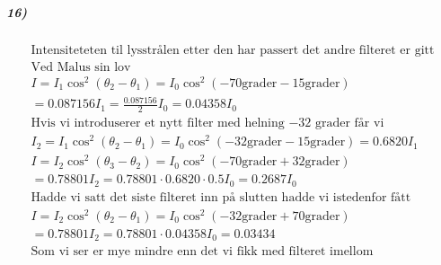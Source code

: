 \documentclass[11pt, A4paper,norsk]{article}
\begin{document}
			\subparagraph{16)}
				\begin{gather*}
\text{Intensiteteten til lysstrålen etter den har passert det andre filteret er gitt} \\
\text{Ved Malus sin lov} \\
I = I_1 \cos^2(\theta_2 - \theta_1) = I_0 \cos^2(-70 \text{grader} - 15 \text{grader}) \\
= 0.087156 I_1 = \frac{0.087156}{2} I_0 = 0.04358 I_0 \\
\text{Hvis vi introduserer et nytt filter med helning $-32$ grader får vi} \\
I_2 = I_1 \cos^2(\theta_2 - \theta_1) = I_0 \cos^2(-32 \text{grader} - 15 \text{grader}) = 0.6820 I_1\\
I = I_2 \cos^2(\theta_3 - \theta_2) = I_0 \cos^2(-70 \text{grader} + 32 \text{grader}) \\
= 0.78801 I_2 = 0.78801 \cdot 0.6820 \cdot 0.5 I_0 = 0.2687 I_0 \\
\text{Hadde vi satt det siste filteret inn på slutten hadde vi istedenfor fått} \\
I = I_2 \cos^2(\theta_2 - \theta_1) = I_0 \cos^2(-32 \text{grader} + 70 \text{grader}) \\
= 0.78801 I_2 = 0.78801 \cdot 0.04358 I_0 = 0.03434 \\
\text{Som vi ser er mye mindre enn det vi fikk med filteret imellom}
				\end{gather*}
\end{document}
